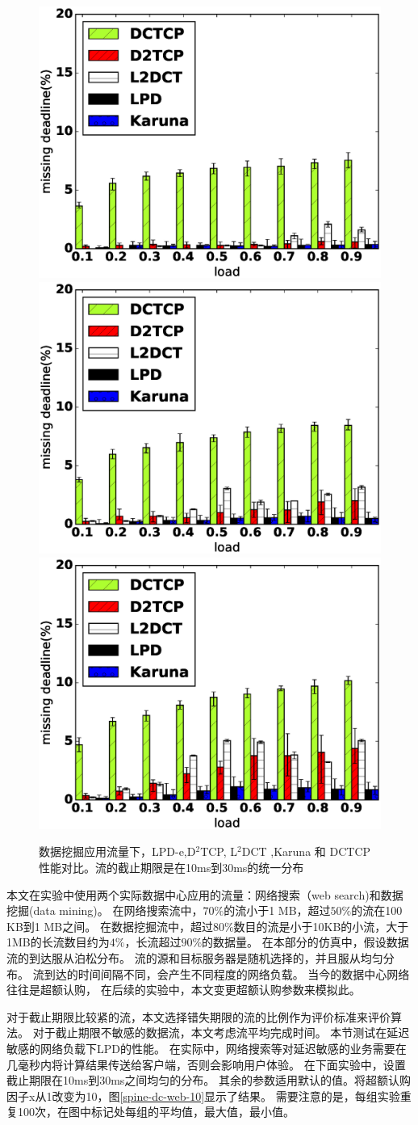 \begin{figure}[h]
\centering
{}
 {\includegraphics[width=0.32\columnwidth]{figures/LPD/spineleaf/miss_deadline_4.eps}}
{\includegraphics[width=0.32\columnwidth]{figures/LPD/spineleaf/miss_deadline_6.eps}}
{\includegraphics[width=0.32\columnwidth]{figures/LPD/spineleaf/miss_deadline_9.eps}}
\caption{数据挖掘应用流量下，LPD-e,D$^2$TCP, L$^2$DCT ,Karuna 和 DCTCP性能对比。流的截止期限是在10ms到30ms的统一分布}
\label{miss-spine-data-fig}
\end{figure}


本文在实验中使用两个实际数据中心应用的流量：网络搜索（web search)和数据挖掘(data mining)\cite{DCTCP,pFabric}。
在网络搜索流中，$70\%$的流小于1 MB，超过$50\%$的流在100 KB到1 MB之间。
在数据挖掘流中，超过$80\%$数目的流是小于10KB的小流，大于1MB的长流数目约为$4\%$，长流超过$90\%$的数据量。
在本部分的仿真中，假设数据流的到达服从泊松分布。 
流的源和目标服务器是随机选择的，并且服从均匀分布。
流到达的时间间隔不同，会产生不同程度的网络负载。
当今的数据中心网络往往是超额认购\cite{CloudMirror}，
在后续的实验中，本文变更超额认购参数来模拟此。






对于截止期限比较紧的流，本文选择错失期限的流的比例作为评价标准来评价算法。
对于截止期限不敏感的数据流，本文考虑流平均完成时间。
本节测试在延迟敏感的网络负载下LPD的性能。
在实际中，网络搜索等对延迟敏感的业务需要在几毫秒内将计算结果传送给客户端，否则会影响用户体验。
在下面实验中，设置截止期限在10ms到30ms之间均匀的分布。
其余的参数适用默认的值。将超额认购因子x从1改变为10，图\ref{spine-dc-web-10}显示了结果。
需要注意的是，每组实验重复100次，在图中标记处每组的平均值，最大值，最小值。



